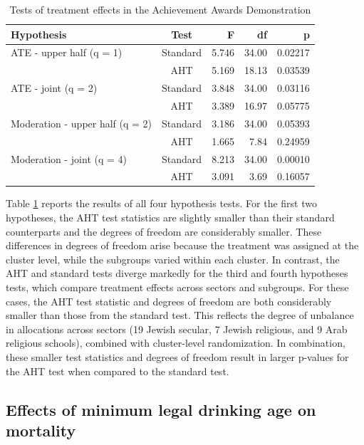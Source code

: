 \documentclass[12pt]{article}
\begin{document}
\begin{table}[bth]
\centering
\caption{Tests of treatment effects in the Achievement Awards Demonstration} 
\label{tab:AAD}
\begin{tabular}{lcrrr}
  \toprule
Hypothesis & Test & F & df & p \\ 
  \midrule
ATE - upper half (q = 1) & Standard & 5.746 & 34.00 & 0.02217 \\ 
   & AHT & 5.169 & 18.13 & 0.03539 \\ 
  ATE - joint (q = 2) & Standard & 3.848 & 34.00 & 0.03116 \\ 
   & AHT & 3.389 & 16.97 & 0.05775 \\ 
   \midrule
Moderation - upper half (q = 2) & Standard & 3.186 & 34.00 & 0.05393 \\ 
   & AHT & 1.665 & 7.84 & 0.24959 \\ 
  Moderation - joint (q = 4) & Standard & 8.213 & 34.00 & 0.00010 \\ 
   & AHT & 3.091 & 3.69 & 0.16057 \\ 
   \bottomrule
\end{tabular}
\end{table}

Table \ref{tab:AAD} reports the results of all four hypothesis tests.
For the first two hypotheses, the AHT test statistics are slightly
smaller than their standard counterparts and the degrees of freedom are
considerably smaller. These differences in degrees of freedom arise
because the treatment was assigned at the cluster level, while the
subgroups varied within each cluster. In contrast, the AHT and standard
tests diverge markedly for the third and fourth hypotheses tests, which
compare treatment effects across sectors and subgroups. For these cases,
the AHT test statistic and degrees of freedom are both considerably
smaller than those from the standard test. This reflects the degree of
unbalance in allocations across sectors (19 Jewish secular, 7 Jewish
religious, and 9 Arab religious schools), combined with cluster-level
randomization. In combination, these smaller test statistics and degrees
of freedom result in larger p-values for the AHT test when compared to
the standard test.

\hypertarget{effects-of-minimum-legal-drinking-age-on-mortality}{%
\subsection{Effects of minimum legal drinking age on
mortality}\label{effects-of-minimum-legal-drinking-age-on-mortality}}
\end{document}
